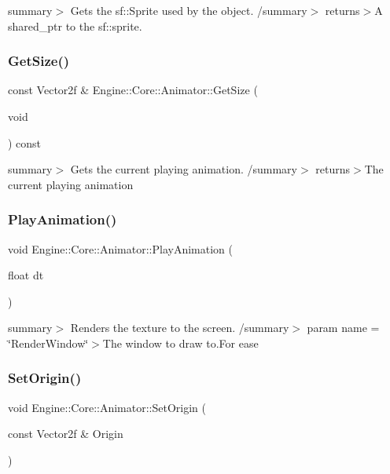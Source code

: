 summary$>$ Gets the sf\+::\+Sprite used by the object. /summary$>$ returns$>$A shared\+\_\+ptr to the sf\+::sprite.\mbox{\label{class_engine_1_1_core_1_1_animator_a1d8675cde73dfe307d11bde8ffccf78c}} 
\subsubsection{\texorpdfstring{Get\+Size()}{GetSize()}}
{\footnotesize\ttfamily const Vector2f \& Engine\+::\+Core\+::\+Animator\+::\+Get\+Size (\begin{DoxyParamCaption}\item[{void}]{ }\end{DoxyParamCaption}) const}

summary$>$ Gets the current playing animation. /summary$>$ returns$>$The current playing animation\mbox{\label{class_engine_1_1_core_1_1_animator_a2605b91ae769e14ab92d9a210e4b3d5c}} 
\subsubsection{\texorpdfstring{Play\+Animation()}{PlayAnimation()}}
{\footnotesize\ttfamily void Engine\+::\+Core\+::\+Animator\+::\+Play\+Animation (\begin{DoxyParamCaption}\item[{float}]{dt }\end{DoxyParamCaption})}

summary$>$ Renders the texture to the screen. /summary$>$ param name = \char`\"{}\+Render\+Window\char`\"{}$>$The window to draw to.For ease \mbox{\label{class_engine_1_1_core_1_1_animator_ac5d217c5dd3257349dca55cd6a62b7ed}} 
\subsubsection{\texorpdfstring{Set\+Origin()}{SetOrigin()}}
{\footnotesize\ttfamily void Engine\+::\+Core\+::\+Animator\+::\+Set\+Origin (\begin{DoxyParamCaption}\item[{const Vector2f \&}]{Origin }\end{DoxyParamCaption})}

